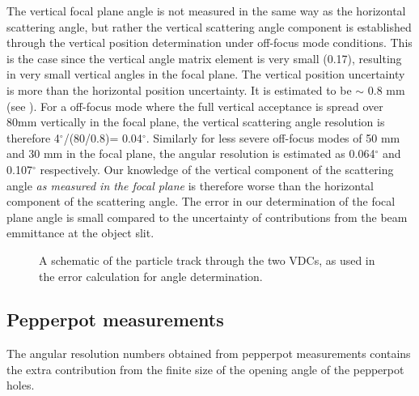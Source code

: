 \documentclass[11pt]{report}
\begin{document}
The vertical focal plane angle is not measured in the same way as the horizontal scattering angle, 
but rather the vertical scattering angle component is
established through the vertical position determination under off-focus mode conditions.
This is the case since the vertical angle matrix element is very small (0.17),
resulting in very small vertical angles in the focal plane.
The vertical position uncertainty is more than the horizontal position uncertainty.
It is estimated to be $\sim$ 0.8 mm (see \cite{Nev11}).  
For a off-focus mode where the full vertical acceptance is spread over 80mm vertically
in the focal plane, the vertical scattering angle resolution is therefore 4$^{\circ}$/(80/0.8)= 0.04$^{\circ}$. Similarly for 
less severe off-focus modes of 50 mm and 30 mm in the focal plane, the angular resolution is estimated as 0.064$^{\circ}$ 
and 0.107$^{\circ}$ respectively.
%
Our knowledge of the vertical component of the scattering angle {\it as measured in the focal plane} is therefore worse than the horizontal component of the scattering angle.
%
The error in our determination of the focal plane angle is small compared to the uncertainty of contributions from the beam emmittance at the object slit.

\begin{figure}[!ht]
\centerline{\vspace{0cm}\hspace{0cm}
}
\centering
\caption{A schematic of the particle track through the two VDCs, as used in the error calculation for angle determination.}
\label{fig:ang-err-calc1}
\end{figure} 



\subsection{Pepperpot measurements}

The angular resolution numbers obtained from pepperpot measurements 
contains the extra contribution from the finite size of the opening angle of the pepperpot holes.
\end{document}
